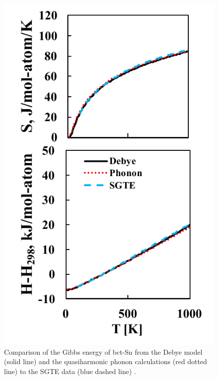 \pagebreak
\begin{figure}[H]
	\centering
	\includegraphics[scale=1.0]{Chapter-4/Figures/Snfinitetemp.pdf}
	\caption{Comparison of the Gibbs energy of bct-Sn from the Debye model (solid line) and the quasiharmonic phonon calculations (red dotted line) to the SGTE data (blue dashed line) \cite{Dinsdale1991}.}
	\label{Ch4-figure:Snfinitetemp}
\end{figure}

